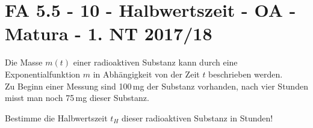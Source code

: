 \section{FA 5.5 - 10 - Halbwertszeit - OA - Matura - 1. NT 2017/18}

\begin{beispiel}[FA 5.5]{1}
Die Masse $m(t)$ einer radioaktiven Substanz kann durch eine Exponentialfunktion $m$ in Abhängigkeit von der Zeit $t$ beschrieben werden.\\
Zu Beginn einer Messung sind 100\,mg der Substanz vorhanden, nach vier Stunden misst man noch 75\,mg dieser Substanz.

Bestimme die Halbwertszeit $t_H$ dieser radioaktiven Substanz in Stunden!

\end{beispiel}